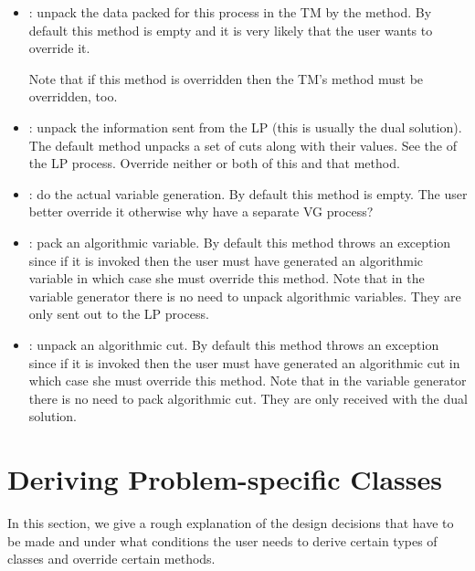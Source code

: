 \begin{itemize}
\item {}: unpack the data packed for this process in
  the TM by the  method. By default
  this method is empty and it is very likely that the user wants to override
  it.

  Note that if this method is overridden then the TM's
   method must be overridden, too.

\item {}: unpack the information sent from 
  the LP (this is usually the dual solution). The default method unpacks a
  set of cuts along with their values. See the 
   of the LP process.
  Override neither or both of this and that method.

\item {}: do the actual variable generation. By default
  this 
  method is empty. The user better override it otherwise why have a separate
  VG process?

\item {}: pack an algorithmic variable. By
  default this method throws an exception since if it is invoked then the user
  must have generated an algorithmic variable in which case she must override
  this method. Note that in the variable generator there is no need to unpack
  algorithmic variables. They are only sent out to the LP process.

\item {}: unpack an algorithmic cut. By
  default this method throws an exception since if it is invoked then the user
  must have generated an algorithmic cut in which case she must override
  this method. Note that in the variable generator there is no need to pack
  algorithmic cut. They are only received with the dual solution.

\end{itemize}

\section{Deriving Problem-specific Classes}

In this section, we give a rough explanation of the design decisions
that have to be made and under what conditions the user needs to
derive certain types of classes and override certain methods.


